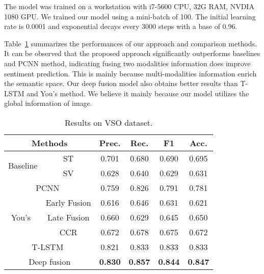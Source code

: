 \documentclass{article}
\begin{document}
The model was trained on a workstation with i7-5600 CPU, 32G RAM, NVDIA 1080 GPU. We trained our model using a mini-batch of 100. The initial learning rate is 0.0001 and exponential decays  every 3000 steps with a base of 0.96.

Table~\ref{tab:VSO} summarizes the performances of our approach and comparison methods. It can be observed that the \mbox{proposed} approach significantly outperforms baselines and PCNN method, indicating fusing two modalities information does improve sentiment prediction. This is mainly because multi-modalities information enrich the semantic space. Our deep fusion model also obtains better results than T-LSTM and \mbox{You's} method. We believe it mainly because our model utilizes the global information of image.
 \vspace{-0.4cm}
\begin{table}[h]
	\centering
	\small
	\caption{Results on VSO dataset.}
	\label{tab:VSO}
	\begin{tabular}{c|c|c|c|c|c}
        \hline
        \multicolumn{2}{c|}{\textbf{Methods}} & \textbf{Prec.} & \textbf{Rec.} & \textbf{F1} & \textbf{Acc.} \\
        \hline
        \multirow{2}{*}{Baseline}& ST& 0.701 & 0.680 & 0.690 & 0.695  \\
        \cline{2-6}
                                 & SV & 0.628 & 0.640 & 0.629 & 0.631   \\
        \hline
       \multicolumn{2}{c|}{PCNN~\cite{you2015robust}} & 0.759 & 0.826 & 0.791 & 0.781  \\\hline
        \multirow{3}{*}{You's~\cite{you2016cross}}&Early Fusion & 0.616 & 0.646 & 0.631 & 0.621  \\
        \cline{2-6}
        &Late Fusion& 0.660 & 0.629 & 0.645 & 0.650  \\
        \cline{2-6}
        &CCR & 0.672 & 0.678 & 0.675 & 0.672  \\\hline
        \multicolumn{2}{c|}{T-LSTM~\cite{you2016robust}} & 0.821 & 0.833 & 0.833 & 0.833  \\\hline
        \multicolumn{2}{c|}{ Deep fusion} & \textbf{0.830} & \textbf{0.857} & \textbf{0.844} & \textbf{0.847}  \\
        \hline
	\end{tabular}
	\vspace{-0.3cm}
\end{table}
\end{document}
